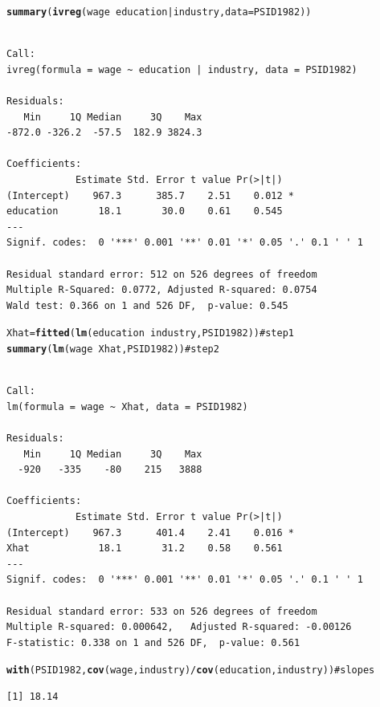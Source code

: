 \documentclass{article}\usepackage{graphicx, color}
\makeatletter
\newcommand{\hlfunctioncall}[1]{\textcolor[rgb]{0.501960784313725,0,0.329411764705882}{\textbf{#1}}}%
\newcommand{\hlcomment}[1]{\textcolor[rgb]{0.180392156862745,0.6,0.341176470588235}{#1}}%
\newenvironment{kframe}{%
 \def\at@end@of@kframe{}%
 \ifinner\ifhmode%
  \def\at@end@of@kframe{\end{minipage}}%
  \begin{minipage}{\columnwidth}%
 \fi\fi%
 \def\FrameCommand##1{\hskip\@totalleftmargin \hskip-\fboxsep
 \colorbox{shadecolor}{##1}\hskip-\fboxsep
     \hskip-\linewidth \hskip-\@totalleftmargin \hskip\columnwidth}%
 \MakeFramed {\advance\hsize-\width
   \@totalleftmargin\z@ \linewidth\hsize
   \@setminipage}}%
 {\par\unskip\endMakeFramed%
 \at@end@of@kframe}
\newenvironment{knitrout}{}{} %
\makeatother
\begin{document}
\begin{knitrout}
\begin{kframe}
\begin{alltt}
\hlfunctioncall{summary}(\hlfunctioncall{ivreg}(wage~education|industry,data=PSID1982))
\end{alltt}
\begin{verbatim}

Call:
ivreg(formula = wage ~ education | industry, data = PSID1982)

Residuals:
   Min     1Q Median     3Q    Max 
-872.0 -326.2  -57.5  182.9 3824.3 

Coefficients:
            Estimate Std. Error t value Pr(>|t|)  
(Intercept)    967.3      385.7    2.51    0.012 *
education       18.1       30.0    0.61    0.545  
---
Signif. codes:  0 '***' 0.001 '**' 0.01 '*' 0.05 '.' 0.1 ' ' 1 

Residual standard error: 512 on 526 degrees of freedom
Multiple R-Squared: 0.0772,	Adjusted R-squared: 0.0754 
Wald test: 0.366 on 1 and 526 DF,  p-value: 0.545 

\end{verbatim}
\begin{alltt}
Xhat=\hlfunctioncall{fitted}(\hlfunctioncall{lm}(education~industry,PSID1982)) \hlcomment{#step 1}
\hlfunctioncall{summary}(\hlfunctioncall{lm}(wage~Xhat,PSID1982)) \hlcomment{#step 2}
\end{alltt}
\begin{verbatim}

Call:
lm(formula = wage ~ Xhat, data = PSID1982)

Residuals:
   Min     1Q Median     3Q    Max 
  -920   -335    -80    215   3888 

Coefficients:
            Estimate Std. Error t value Pr(>|t|)  
(Intercept)    967.3      401.4    2.41    0.016 *
Xhat            18.1       31.2    0.58    0.561  
---
Signif. codes:  0 '***' 0.001 '**' 0.01 '*' 0.05 '.' 0.1 ' ' 1 

Residual standard error: 533 on 526 degrees of freedom
Multiple R-squared: 0.000642,	Adjusted R-squared: -0.00126 
F-statistic: 0.338 on 1 and 526 DF,  p-value: 0.561 

\end{verbatim}
\begin{alltt}
\hlfunctioncall{with}(PSID1982, \hlfunctioncall{cov}(wage,industry)/\hlfunctioncall{cov}(education,industry)) \hlcomment{#slopes}
\end{alltt}
\begin{verbatim}
[1] 18.14
\end{verbatim}
\end{kframe}
\end{knitrout}
\end{document}
